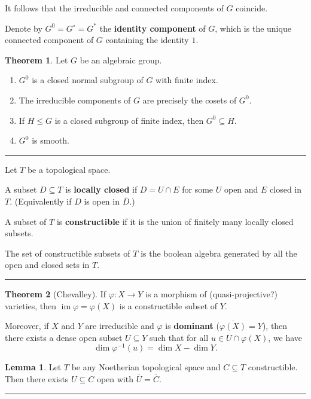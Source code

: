 \documentclass[12pt]{article}
\newcommand{\keyword}[1]{\textbf{#1}}
\newcommand{\sepline}{\rule{\textwidth}{0.4pt}}
\theoremstyle{definition}
\newtheorem{lemma}{Lemma}
\newtheorem{theorem}{Theorem}
\renewcommand{\phi}{\varphi}
\newcommand{\<}{\langle}
\renewcommand{\>}{\rangle}
\newcommand{\clo}{\overline}
\newcommand{\seq}{\subseteq}
\DeclareMathOperator{\im}{im}
\begin{document}
It follows that the irreducible and connected components of $G$ coincide.

Denote by $G^0 = G^\circ = G^*$ the \keyword{identity component} of $G$, which is the unique connected component of $G$ containing the identity $1$.

\begin{theorem}
    Let $G$ be an algebraic group.
    \begin{enumerate}[(1)]
        \item $G^0$ is a closed normal subgroup of $G$ with finite index.
        \item The irreducible components of $G$ are precisely the cosets of $G^0$.
        \item If $H \leq G$ is a closed subgroup of finite index, then $G^0 \seq H$.
        \item $G^0$ is smooth.
    \end{enumerate}
\end{theorem}

\sepline

Let $T$ be a topological space.

A subset $D \seq T$ is \keyword{locally closed} if $D = U \cap E$ for some $U$ open and $E$ closed in $T$.
(Equivalently if $D$ is open in $\clo{D}$.)

A subset of $T$ is \keyword{constructible} if it is the union of finitely many locally closed subsets.

The set of constructible subsets of $T$ is the boolean algebra generated by all the open and closed sets in $T$.

\sepline

\begin{theorem}[Chevalley]
    If $\phi : X \to Y$ is a morphism of (quasi-projective?) varieties, then $\im \phi = \phi(X)$ is a constructible subset of $Y$.

    Moreover, if $X$ and $Y$ are irreducible and $\phi$ is \keyword{dominant} ($\clo{\phi(X)} = Y$), then there exists a dense open subset $U \seq Y$ such that for all $u \in U \cap \phi(X)$, we have
    \[
        \dim\phi^{-1}(u) = \dim X - \dim Y.
    \]
\end{theorem}

\begin{lemma}
    Let $T$ be any Noetherian topological space and $C \seq T$ constructible.
    Then there exists $U \seq C$ open with $\clo{U} = \clo{C}$.
\end{lemma}

\sepline
\end{document}
